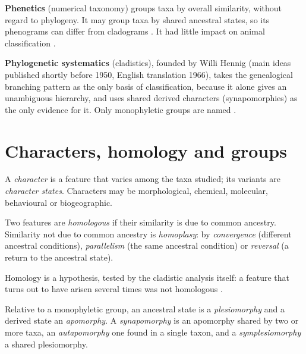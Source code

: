 \textbf{Phenetics} (numerical taxonomy)
groups taxa by overall similarity, without
regard to phylogeny. It may group taxa by
shared ancestral states, so its
phenograms can differ from cladograms
\cite[Chapters 1 and 2]{simpson2006plant}.
It had little impact on animal
classification
\cite[Chapter 4]{hickman2002animal}.

\textbf{Phylogenetic systematics}
(cladistics), founded by Willi Hennig
(main ideas published shortly before 1950,
English translation 1966), takes the
genealogical branching pattern as the only
basis of classification, because it alone
gives an unambiguous hierarchy, and uses
shared derived characters
(synapomorphies) as the only evidence for
it. Only monophyletic groups are named
\cite[Chapter 2]{simpson2006plant}.

\section{Characters, homology and groups}
\label{section-characters}

\begin{definition}
\label{definition-character}
A \emph{character} is a feature that
varies among the taxa studied; its
variants are \emph{character states}.
Characters may be morphological,
chemical, molecular, behavioural or
biogeographic.
\end{definition}

\begin{definition}
\label{definition-homology}
Two features are \emph{homologous} if
their similarity is due to common
ancestry. Similarity not due to common
ancestry is \emph{homoplasy}: by
\emph{convergence} (different ancestral
conditions), \emph{parallelism} (the same
ancestral condition) or \emph{reversal} (a
return to the ancestral state).
\end{definition}

Homology is a hypothesis, tested by the
cladistic analysis itself: a feature that
turns out to have arisen several times was
not homologous
\cite[Chapter 2]{simpson2006plant}.

\begin{definition}
\label{definition-apomorphy}
Relative to a monophyletic group, an
ancestral state is a \emph{plesiomorphy}
and a derived state an \emph{apomorphy}. A
\emph{synapomorphy} is an apomorphy shared
by two or more taxa, an
\emph{autapomorphy} one found in a single
taxon, and a \emph{symplesiomorphy} a
shared plesiomorphy.
\end{definition}

